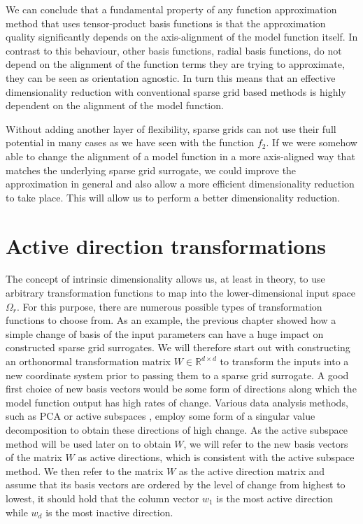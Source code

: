 \documentclass[
  a4paper,  %
  twoside,  %
  bibliography=totoc,
  headsepline,
  cleardoublepage=empty,
  parskip=half,
  draft=false
]{scrbook}
\begin{document}
We can conclude that a fundamental property of any function approximation method that uses tensor-product basis functions is that the approximation quality significantly depends on the axis-alignment of the model function itself.
In contrast to this behaviour, other basis functions, \eg radial basis functions, do not depend on the alignment of the function terms they are trying to approximate, \ie they can be seen as orientation agnostic.
In turn this means that an effective dimensionality reduction with conventional sparse grid based methods is highly dependent on the alignment of the model function.

Without adding another layer of flexibility, sparse grids can not use their full potential in many cases as we have seen with the function $f_2$.
If we were somehow able to change the alignment of a model function in a more axis-aligned way that matches the underlying sparse grid surrogate, we could improve the approximation in general and also allow a more efficient dimensionality reduction to take place.
This will allow us to perform a better dimensionality reduction.

\section{Active direction transformations}

The concept of intrinsic dimensionality allows us, at least in theory, to use arbitrary transformation functions to map into the lower-dimensional input space $\Omega_r$.
For this purpose, there are numerous possible types of transformation functions to choose from.
As an example, the previous chapter showed how a simple change of basis of the input parameters can have a huge impact on constructed sparse grid surrogates.
We will therefore start out with constructing an orthonormal transformation matrix $W \in \mathds{R}^{d \times d}$ to transform the inputs into a new coordinate system prior to passing them to a sparse grid surrogate.
A good first choice of new basis vectors would be some form of directions along which the model function output has high rates of change.
Various data analysis methods, such as PCA \cite{Abdi2010} or active subspaces \cite{Constantine2015}, employ some form of a singular value decomposition to obtain these directions of high change.
As the active subspace method will be used later on to obtain $W$, we will refer to the new basis vectors of the matrix $W$ as active directions, which is consistent with the active subspace method.
We then refer to the matrix $W$ as the active direction matrix and assume that its basis vectors are ordered by the level of change from highest to lowest, \ie it should hold that the column vector $w_1$ is the most active direction while $w_d$ is the most inactive direction.
\end{document}
